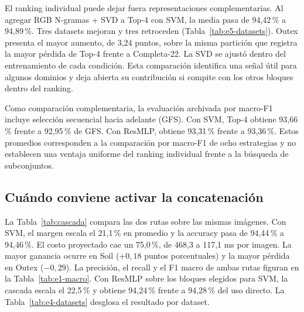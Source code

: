 \documentclass[a4paper,fleqn]{cas-sc}
\begin{document}
El ranking individual puede dejar fuera representaciones complementarias. Al agregar RGB N-gramas + SVD a Top-4 con SVM, la media pasa de 94,42\,\% a 94,89\,\%. Tres datasets mejoran y tres retroceden (Tabla~\ref{tab:e5-datasets}). Outex presenta el mayor aumento, de 3,24 puntos, sobre la misma partición que registra la mayor pérdida de Top-4 frente a Completa-22. La SVD se ajustó dentro del entrenamiento de cada condición. Esta comparación identifica una señal útil para algunos dominios y deja abierta su contribución si compite con los otros bloques dentro del ranking.

Como comparación complementaria, la evaluación archivada por macro-F1 incluye selección secuencial hacia adelante (GFS). Con SVM, Top-4 obtiene 93,66\,\% frente a 92,95\,\% de GFS. Con ResMLP, obtiene 93,31\,\% frente a 93,36\,\%. Estos promedios corresponden a la comparación por macro-F1 de ocho estrategias y no establecen una ventaja uniforme del ranking individual frente a la búsqueda de subconjuntos.

\subsection{Cuándo conviene activar la concatenación}

La Tabla~\ref{tab:cascada} compara las dos rutas sobre las mismas imágenes. Con SVM, el margen escala el 21,1\,\% en promedio y la accuracy pasa de 94,44\,\% a 94,46\,\%. El costo proyectado cae un 75,0\,\%, de 468,3 a 117,1 ms por imagen. La mayor ganancia ocurre en Soil ($+0{,}18$ puntos porcentuales) y la mayor pérdida en Outex ($-0{,}29$). La precisión, el recall y el F1 macro de ambas rutas figuran en la Tabla~\ref{tab:e1-macro}. Con ResMLP sobre los bloques elegidos para SVM, la cascada escala el 22,5\,\% y obtiene 94,24\,\% frente a 94,28\,\% del uso directo. La Tabla~\ref{tab:e4-datasets} desglosa el resultado por dataset.
\end{document}
